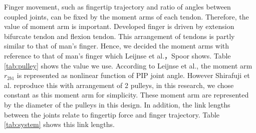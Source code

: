 \documentclass{llncs}
\begin{document}
Finger movement, such as fingertip trajectory and ratio of angles between coupled joints, 
can be fixed by the moment arms of each tendon. 
Therefore, the value of moment arm is important.
Developed finger is driven by extension bifurcate tendon and flexion tendon.
This arrangement of tendons is partly similar to that of man's finger.
Hence, we decided the moment arms with reference to that of man's finger which Leijnse et al.\cite{Leijnse1995}，Spoor\cite{Spoor1983} shows.
Table \ref{tab:pulley} shows the value we use.
According to Leijnse et al.\cite{Leijnse1995}, the moment arm $r_{2b1}$ is represented as nonlinear function of PIP joint angle.
However Shirafuji et al. reproduce this with arrangement of 2 pulleys, 
in this research, we chose constant as this moment arm for simplicity.
These moment arm are represented by the diameter of the pulleys in this design.
In addition, the link lengths between the joints relate to fingertip force and finger trajectory.
Table \ref{tab:system} shows this link lengths.
		
\end{document}
